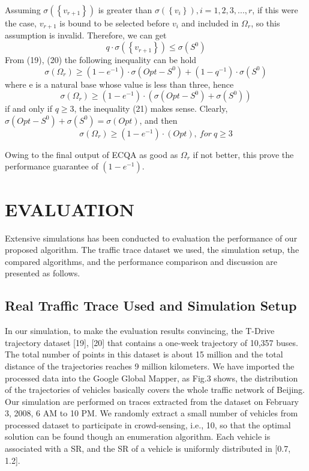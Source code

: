 \documentclass[journal]{IEEEtran}
\begin{document}
Assuming $\sigma\left(\left \{ v_{r+1} \right \}\right)$ is greater than $\sigma\left ( \left \{ v_{i} \right \} \right),i=1,2,3,...,r$, if this were the case, $v_{r+1}$ is bound to be selected before $v_{i}$ and included in $\Omega _{r}$, so this assumption is invalid. Therefore, we can get
\begin{equation}
q\cdot \sigma \left ( \left \{ v_{r+1} \right \} \right )\leqslant \sigma \left ( S^{0} \right )
\end{equation}
From (19), (20) the following inequality can be hold
\begin{equation}
\sigma \left ( \Omega _{r} \right )\geqslant \left ( 1-e^{-1} \right )\cdot \sigma (Opt-S^{0})+(1-q^{-1})\cdot \sigma (S^{0})
\end{equation}
where e is a natural base whose value is less than three, hence
\begin{equation}
\sigma \left ( \Omega _{r} \right )\geqslant \left ( 1-e^{-1} \right )\cdot (\sigma (Opt-S^{0})+\sigma (S^{0}))
\end{equation}
if and only if $q\geqslant 3$, the inequality (21) makes sense. Clearly, $\sigma(Opt-S^{0})+\sigma (S^{0})=\sigma (Opt)$, and then
\begin{equation}
\sigma(\Omega_{r})\geqslant (1-e^{-1})\cdot (Opt), \ for \ q\geqslant 3
\end{equation}

Owing to the final output of ECQA as good as $\Omega_{r}$ if not better, this prove the performance guarantee of $(1-e^{-1})$.


\section{EVALUATION}
Extensive simulations has been conducted to evaluation the performance of our proposed algorithm. The traffic trace dataset we used, the simulation setup, the compared algorithms, and the performance comparison and discussion are presented as follows.


\subsection{Real Traffic Trace Used and Simulation Setup}
In our simulation, to make the evaluation results convincing, the T-Drive trajectory dataset [19], [20] that contains a one-week trajectory of 10,357 buses. The total number of points in this dataset is about 15 million and the total distance of the trajectories reaches 9 million kilometers. We have imported the processed data into the Google Global Mapper, as Fig.3 shows, the distribution of the trajectories of vehicles basically covers the whole traffic network of Beijing. Our simulation are performed on traces extracted from the dataset on February 3, 2008, 6 AM to 10 PM. We randomly extract a small number of vehicles from processed dataset to participate in crowd-sensing, i.e., 10, so that the optimal solution can be found though an enumeration algorithm. Each vehicle is associated with a SR, and the SR of a vehicle is uniformly distributed in [0.7, 1.2].   
\end{document}
